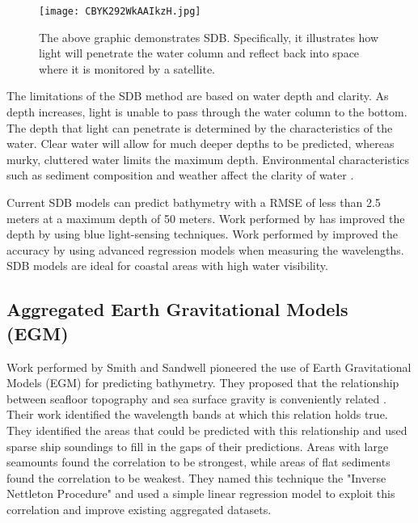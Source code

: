 \begin{figure}[htp]
    \centering
    \texttt{[image: CBYK292WkAAIkzH.jpg]}
    \caption{The above graphic demonstrates \ac{SDB}.
    Specifically, it illustrates how light will penetrate the water column and reflect back into space where it is monitored by a satellite.}
    \label{fig:sdb}
\end{figure}

\par
The limitations of the \ac{SDB} method are based on water depth and clarity.
As depth increases, light is unable to pass through the water column to the bottom.
The depth that light can penetrate is determined by the characteristics of the water.
Clear water will allow for much deeper depths to be predicted, whereas murky, cluttered water limits the maximum depth.
Environmental characteristics such as sediment composition and weather affect the clarity of water \cite{vinayaraj2016satellite}.

\par
Current \ac{SDB} models can predict bathymetry with a \ac{RMSE} of less than 2.5 meters at a maximum depth of 50 meters.
Work performed by \cite{vinayaraj2016satellite} has improved the depth by using blue light-sensing techniques.
Work performed by \cite{chybicki2018three} improved the accuracy by using advanced regression models when measuring the wavelengths.
\ac{SDB} models are ideal for coastal areas with high water visibility.

\subsection{Aggregated Earth Gravitational Models (EGM)}
Work performed by Smith and Sandwell \cite{smith1994bathymetric}\cite{smith1997global} pioneered the use of Earth Gravitational Models (EGM) for predicting bathymetry.
They proposed that the relationship between seafloor topography and sea surface gravity is conveniently related \cite{smith1994bathymetric}.
Their work identified the wavelength bands at which this relation holds true.
They identified the areas that could be predicted with this relationship and used sparse ship soundings to fill in the gaps of their predictions.
Areas with large seamounts found the correlation to be strongest, while areas of flat sediments found the correlation to be weakest.
They named this technique the "Inverse Nettleton Procedure" and used a simple linear regression model to exploit this correlation and improve existing aggregated datasets.

